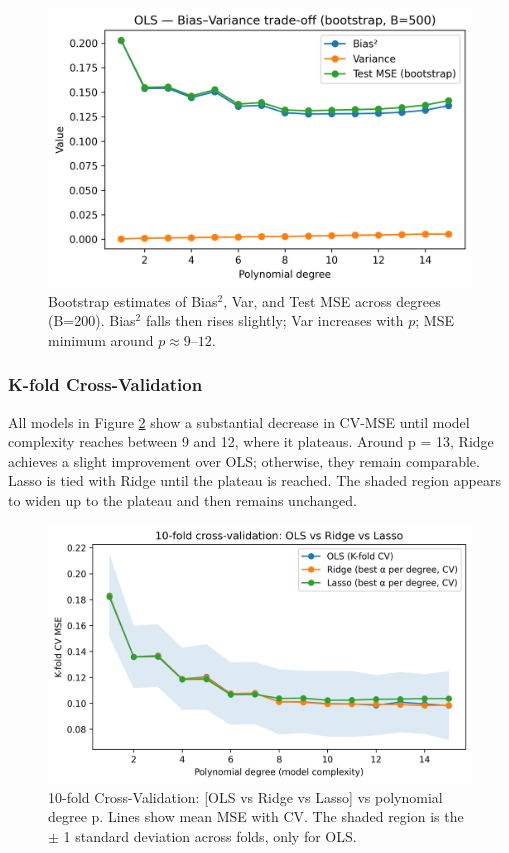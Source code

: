 \documentclass[amssymb,twocolumn,aps,floatfix]{revtex4-2}
\begin{document}
\begin{figure}[t]
    \centering
    \includegraphics[width=1\linewidth]{Project-1/Figures/g_ols_bias_variance_bootstrap.png}
    \caption{Bootstrap estimates of Bias$^2$, Var, and Test MSE across degrees (B=200). Bias$^2$ falls then rises slightly; Var increases with $p$; MSE minimum around $p\approx 9$–$12$.}
    \label{fig:g_ols}
\end{figure}

\subsubsection{K-fold Cross-Validation}

All models in Figure \ref{fig:10_fold_CV} show a substantial decrease in CV-MSE until model complexity reaches between 9 and 12, where it plateaus. Around p = 13, Ridge achieves a slight improvement over OLS; otherwise, they remain comparable. Lasso is tied with Ridge until the plateau is reached. The shaded region appears to widen up to the plateau and then remains unchanged. 

\begin{figure}[t]
    \centering
    \includegraphics[width=1\linewidth]{Project-1/Figures/cv_mse.png}
    \caption{10-fold Cross-Validation: [OLS vs Ridge vs Lasso] vs polynomial degree p. Lines show mean MSE with CV. The shaded region is the $\pm$ 1 standard deviation across folds, only for OLS.}
    \label{fig:10_fold_CV}
\end{figure}
\end{document}
